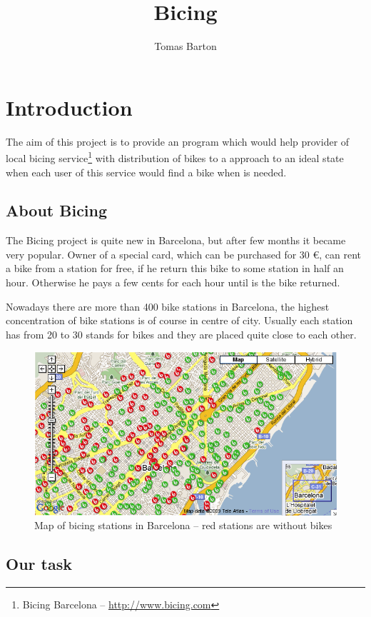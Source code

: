 \documentclass[a4paper,10pt]{report}
\title{Bicing}
\author{Tomas Barton}
\begin{document}
\maketitle

\begin{abstract}
\end{abstract}

\chapter{Introduction}
The aim of this project is to provide an program which would help provider of local bicing service\footnote{Bicing Barcelona -- \url{http://www.bicing.com}} with distribution of bikes to a approach to an ideal state when each user of this service would find a bike when is needed. 

\section{About Bicing}
The Bicing project is quite new in Barcelona, but after few months it became very popular. Owner of a special card, which can be purchased for 30 \euro, can rent a bike from a station for free, if he return this bike to some station in half an hour. Otherwise he pays a few cents for each hour until is the bike returned. 

Nowadays there are more than 400 bike stations in Barcelona, the highest concentration of bike stations is of course in centre of city. Usually each station has from 20 to 30 stands for bikes and they are placed quite close to each other.

\begin{figure}[ht]
\begin{center}
\includegraphics[width=\textwidth]{images/bicing_map.png}
\caption{Map of bicing stations in Barcelona -- red stations are without bikes}
\label{img:bicing_map}
\end{center}
\end{figure}

\section{Our task}
\end{document}
